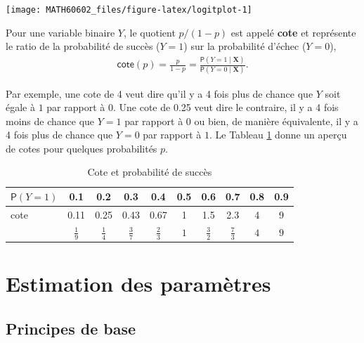 \documentclass[
  11pt,
  letterpaper,
]{book}
\theoremstyle{definition}
\theoremstyle{definition}
\theoremstyle{definition}
\theoremstyle{remark}
\begin{document}
\begin{center}\texttt{[image: MATH60602\_files/figure-latex/logitplot-1]} \end{center}

Pour une variable binaire \(Y\), le quotient \(p/(1-p)\) est appelé \textbf{cote} et représente le ratio de la probabilité de succès (\(Y=1\)) sur la probabilité d'échec (\(Y=0\)),
\begin{align*}
 \mathsf{cote}(p) = \frac{p}{1-p} = \frac{{\mathsf P}\left(Y=1 \mid \boldsymbol{X}\right)}{{\mathsf P}\left(Y=0 \mid \boldsymbol{X}\right)}.
\end{align*}

Par exemple, une cote de 4 veut dire qu'il y a 4 fois plus de chance que \(Y\) soit égale à \(1\) par rapport à \(0\). Une cote de 0.25 veut dire le contraire, il y a 4 fois moins de chance que \(Y=1\) par rapport à \(0\) ou bien, de manière équivalente, il y a 4 fois plus de chance que \(Y=0\) par rapport à \(1\). Le Tableau \ref{tab:03-cotes} donne un aperçu de cotes pour quelques probabilités \(p\).

\begin{table}

\caption{\label{tab:03-cotes}Cote et probabilité de succès}
\centering
\begin{tabular}[t]{lccccccccc}
\toprule
${\mathsf P}\left(Y=1\right)$ & 0.1 & 0.2 & 0.3 & 0.4 & 0.5 & 0.6 & 0.7 & 0.8 & 0.9\\
\midrule
cote & 0.11 & 0.25 & 0.43 & 0.67 & 1 & 1.5 & 2.3 & 4 & 9\\
 & $\frac{1}{9}$ & $\frac{1}{4}$ & $\frac{3}{7}$ & $\frac{2}{3}$ & $1$ & $\frac{3}{2}$ & $\frac{7}{3}$ & $4$ & $9$\\
\bottomrule
\end{tabular}
\end{table}

\hypertarget{estimation-des-paramuxe8tres}{%
\section{Estimation des paramètres}\label{estimation-des-paramuxe8tres}}

\hypertarget{principes-de-base}{%
\subsection{Principes de base}\label{principes-de-base}}
\end{document}
